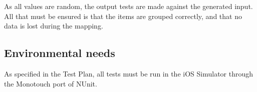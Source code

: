 As all values are random, the output tests are made against the generated input.
All that must be ensured is that the items are grouped correctly, and that no
data is lost during the mapping.


\subsection{Environmental needs} %
\label{sec:Environmental_needs}

As specified in the Test Plan, all tests must be run in the iOS Simulator through the
Monotouch port of NUnit.




